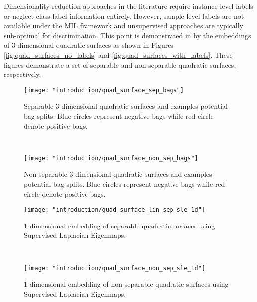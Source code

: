 Dimensionality reduction approaches in the literature require instance-level labels or neglect class label information entirely. However, sample-level labels are not available under the MIL framework and unsupervised approaches are typically sub-optimal for discrimination.  This point is demonstrated in by the embeddings of 3-dimensional quadratic surfaces as shown in Figures \ref{fig:quad_surfaces_no_labels} and \ref{fig:quad_surfaces_with_labels}.  These figures demonstrate a set of separable and non-separable quadratic surfaces, respectively. 
 \begin{figure*}[t!]
 	\centering
 	\begin{subfigure}[t]{0.5\textwidth}
 		\centering
 		\texttt{[image: "introduction/quad\_surface\_sep\_bags"]}
 		\caption{Separable 3-dimensional quadratic surfaces and examples potential bag splits.  Blue circles represent negative bags while red circle denote positive bags.}
 		\label{fig:quad_surface_sep_bags}
 	\end{subfigure}%
 	~ 
 	\begin{subfigure}[t]{0.5\textwidth}
 		\centering
 		\texttt{[image: "introduction/quad\_surface\_non\_sep\_bags"]}
 		\caption{Non-separable 3-dimensional quadratic surfaces and examples potential bag splits. Blue circles represent negative bags while red circle denote positive bags.}
 		\label{fig:quad_surface_non_sep_bags}
 	\end{subfigure}
 	
 	
 	\begin{subfigure}[t]{0.5\textwidth}
 		\centering
 		\texttt{[image: "introduction/quad\_surface\_lin\_sep\_sle\_1d"]}
 		\caption{1-dimensional embedding of separable quadratic surfaces using Supervised Laplacian Eigenmaps.}
 		\label{fig:quad_surface_lin_sep_sle_1d}
 	\end{subfigure}%
 	~ 
 	\begin{subfigure}[t]{0.5\textwidth}
 		\centering
 		\texttt{[image: "introduction/quad\_surface\_non\_sep\_sle\_1d"]}
 		\caption{1-dimensional embedding of non-separable quadratic surfaces using Supervised Laplacian Eigenmaps.}
 		\label{fig:quad_surface_non_sep_sle_1d}
 	\end{subfigure}
 	\caption[Supervised embedding of quadratic surfaces]{Embedding of quadratic surfaces using Supervised Laplacian Eigenmaps.}
 	\label{fig:quad_surfaces_with_labels}%
 \end{figure*} 
